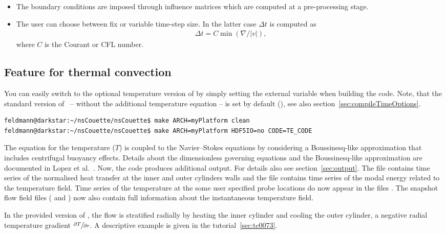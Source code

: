 \documentclass[a4paper, 11pt, DIV=11]{scrartcl}
\begin{document}
\begin{itemize}
\item The boundary conditions are imposed through influence matrices which are
computed at a pre-processing stage.

\item The user can choose between fix or variable time-step size. In the latter
case $\Delta t$ is computed as
\begin{align}
\Delta t = C \min\left(\nabla / \lvert v\rvert\right)
\text{,}
\end{align}
where $C$ is the Courant or CFL number.

\end{itemize}

\subsection{Feature for thermal convection}
\label{sec:thermalConvection}

You can easily switch to the optional temperature version of \nsc by simply
setting the external variable  when building the code.
Note, that the standard version of \nsc~-- \ie without the additional
temperature equation -- is set by default (), see also
section~\ref{sec:compileTimeOptions}.
\begin{lstlisting}[language=bash]
feldmann@darkstar:~/nsCouette/nsCouette$ make ARCH=myPlatform clean
feldmann@darkstar:~/nsCouette/nsCouette$ make ARCH=myPlatform HDF5IO=no CODE=TE_CODE
\end{lstlisting}
\par
The equation for the temperature ($T$) is coupled to the Navier--Stokes
equations by considering a Boussinesq-like approximation that includes
centrifugal buoyancy effects. Details about the dimensionless governing
equations and the Boussinesq-like approximation are documented in Lopez
et al.~\cite{Lopez2013}. Now, the code produces additional output. For
details also see section~\ref{sec:output}. The file 
contains time series of the normalised heat transfer at the inner and
outer cylinders walls and the file  contains time
series of the modal energy related to the temperature field. Time series
of the temperature at the some user specified probe locations do now
appear in the files . The snapshot flow field files
( and ) now also contain full information
about the instantaneous temperature field.
\par
In the provided version of \nsc, the flow is stratified radially by
heating the inner cylinder and cooling the outer cylinder, \ie a
negative radial temperature gradient $\sfrac{\partial T}{\partial r}$.
A descriptive example is given in the tutorial~\ref{sec:tc0073}.
\end{document}
